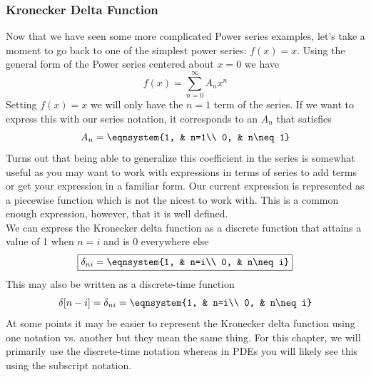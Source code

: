 \subsubsection{Kronecker Delta Function}
Now that we have seen some more complicated Power series examples, let's take a moment to go back to one of the simplest power series: $f(x)=x$. Using the general form of the Power series centered about $x=0$ we have
$$f(x)=\sum_{n=0}^\infty A_nx^n$$
Setting $f(x)=x$ we will only have the $n=1$ term of the series. If we want to express this with our series notation, it corresponds to an $A_n$ that satisfies
$$A_n=\eqnsystem{1, & n=1\\ 0, & n\neq 1}$$
Turns out that being able to generalize this coefficient in the series is somewhat useful as you may want to work with expressions in terms of series to add terms or get your expression in a familiar form. Our current expression is represented as a piecewise function which is not the nicest to work with. This is a common enough expression, however, that it is well defined.\\
We can express the Kronecker delta function as a discrete function that attains a value of 1 when $n=i$ and is 0 everywhere else
$$\boxed{\delta_{ni}=\eqnsystem{1, & n=i\\ 0, & n\neq i}}$$
This may also be written as a discrete-time function
$$\delta[n-i]=\delta_{ni}=\eqnsystem{1, & n=i\\ 0, & n\neq i}$$
At some points it may be easier to represent the Kronecker delta function using one notation vs. another but they mean the same thing. For this chapter, we will primarily use the discrete-time notation whereas in PDEs you will likely see this using the subscript notation.\\

